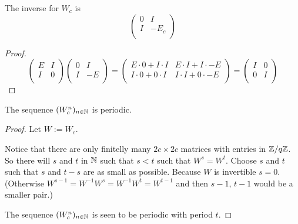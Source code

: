 \begin{lemma}\label{lemma:Winverse}
	The inverse for $W_{c}$ is
	\[
 		\left(
		\begin{array}{cc}
			0 & I      \\
			I & -E_{c} \\
		\end{array}
		\right)
	\]
\end{lemma}

\begin{proof}
	\[
 		\left(
		\begin{array}{cc}
			E & I \\
			I & 0 \\
		\end{array}
		\right)		
 		\left(
		\begin{array}{cc}
			0 & I  \\
			I & -E \\
		\end{array}
		\right)
		=
 		\left(
		\begin{array}{cc}
			E \cdot 0 + I \cdot I & E \cdot I + I \cdot -E \\
			I \cdot 0 + 0 \cdot I & I \cdot I + 0 \cdot -E \\
		\end{array}
		\right)
		=
 		\left(
		\begin{array}{cc}
			I & 0 \\
			0 & I \\
		\end{array}
		\right)		
	\]
\end{proof}

\begin{corollary}\label{corollary:Wperiodic}
	The sequence $(W_{c}^{n})_{n\in\mathbb{N}}$ is periodic.
\end{corollary}

\begin{proof}
	Let $W := W_{c}$.
	
	Notice that there are only finitelly many $2c \times 2c$ matrices with
	entries in $\mathbb{Z}/q\mathbb{Z}$. So there will $s$ and $t$ in $\mathbb{N}$ such that $s<t$
	such that $W^{s} = W^{t}$. Choose $s$ and $t$ such that $s$ and $t-s$
	are as small as possible. Because $W$ is invertible $s=0$. (Otherwise
	$W^{s-1} = W^{-1} W^{s} = W^{-1} W^{t} = W^{t-1}$ and then $s-1$, $t-1$
	would be a smaller pair.)
	
	The sequence $(W_{c}^{n})_{n\in\mathbb{N}}$ is seen to be periodic with period
	$t$.
\end{proof}

